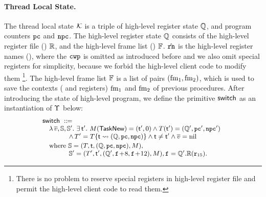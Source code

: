 \paragraph{\textbf{Thread Local State.}}
The thread local state $\mathcal{K}$
is a triple of high-level register state
 $\mathbb{Q}$,
and program counters $\texttt{pc}$ and $\texttt{npc}$. The high-level
register state $\mathbb{Q}$ consists of
the high-level register file () $\mathbb{R}$,
and the high-level frame list () $\mathbb{F}$.
$\hat{\texttt{rn}}$ is the high-level register names (), 
where the $\texttt{cwp}$ is omitted as introduced before and
we also omit special registers for simplicity,
because we forbid
the high-level client code to modify them
\footnote{There is no problem to reserve special
registers in high-level register file and permit
the high-level client code to read them.}.
The high-level frame list $\mathbb{F}$ is a list of pairs
$(\text{fm}_1, \text{fm}_2)$, which is used to save
the contexts (\localRN{} and \inRN{} registers)
$\text{fm}_1$ and $\text{fm}_2$ of previous procedures.
After introducing the state of high-level program,
we define the primitive $\mathsf{switch}$ as
an instantiation of $\Upsilon$ below:
\[
    \small\!\!
    \begin{array}{l}
        \primsw \ \define \\
        \quad
        \lambda \, \args{\val}, \hpstate, \hpstate'. \
        \exists \, \thrdid'. \
        \Mem(\TaskNew) = (\thrdid', 0) \land
        \thrdpool(\thrdid') =
            (\hRstate', \pc', \npc') \\
        \qquad\qquad
        \land \,
        \thrdpool' = \thrdpool\{ \thrdid \rightsquigarrow
            (\hRstate, \pc, \npc) \}
            \land \tid \neq \tid' \land \args{\val} = \nil \\
        \\[-9pt]
        \quad \text{where} \
        \hpstate =
            (\thrdpool, \thrdid, (\hRstate, \pc, \npc), \Mem), \\
        \qquad\qquad
        \hpstate' =
            (\thrdpool', \thrdid',
                (\hRstate', \lab{}\!+\!8, \lab{}\!+\!12), \Mem),
                \lab{} = \hRstate'.\hRfile(\reg{15}).
    \end{array}
\]
